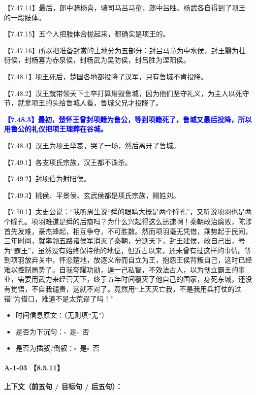 \documentclass[fontset=none,11pt,a4paper]{ctexart}
\newcommand{\answerline}[1]{\underline{\hspace{#1}}}
\newcommand{\choicebox}[1]{$\square$~#1}
\begin{document}
\noindent 【7.47.14】最后，郎中骑杨喜，骑司马吕马童，郎中吕胜、杨武各自得到了项王的一段肢体。\par
\noindent 【7.47.15】五个人把肢体合拢起来，都确实是项王的。\par
\noindent 【7.47.16】所以把准备封赏的土地分为五部分：封吕马童为中水侯，封王翳为杜衍侯，封杨喜为赤泉侯，封杨武为吴防侯，封吕胜为涅阳侯。\par
\noindent 【7.48.1】项王死后，楚国各地都投降了汉军，只有鲁城不肯投降。\par
\noindent 【7.48.2】汉王就带领天下士卒打算屠毁鲁城，因为他们坚守礼义，为主人以死守节，就拿项王的头给鲁城人看，鲁城父兄才投降了。\par
\noindent \textcolor{blue}{\textbf{【7.48.3】最初，楚怀王曾封项籍为鲁公，等到项籍死了，鲁城又最后投降，所以用鲁公的礼仪把项王理葬在谷城。}}\par
\noindent 【7.48.4】汉王为项王举哀，哭了一场，然后离开了鲁城。\par
\noindent 【7.49.1】各支项氏宗族，汉王都不诛杀。\par
\noindent 【7.49.2】封项伯为射阳侯。\par
\noindent 【7.49.3】桃侯、平景侯、玄武侯都是项氏宗族，赐姓刘。\par
\noindent 【7.50.1】太史公说：“我听周生说“舜的眼睛大概是两个瞳孔”，又听说项羽也是两个瞳孔。项羽难道是舜的后裔吗？为什么兴起得这么迅速啊！秦朝政治腐败，陈涉首先发难，豪杰蜂起，相互争夺，不可胜数。然而项羽毫无凭借，乘势起于民间，三年时间，就率领五路诸侯军消灭了秦朝，分割天下，封王建侯，政自己出，号为“霸王”，虽然没有始终保持他的地位，但近古以来，还未曾有过这样的事情。等到项羽放弃关中，怀恋楚地，放逐义帝而自立为王，抱怨王侯背叛自己，这时已经难以控制局势了。自我夸耀功勋，逞一己私智，不效法古人，以为创立霸王的事业，需要用武力来经营天下，终于五年时间覆灭了他自己的国家，身死东城，还没有觉悟，不自我谴责，这就不对了。竟然用“上天灭亡我，不是我用兵打仗的过错”为借口，难道不是太荒谬了吗！”\par

\begin{itemize}
  \item 时间信息原文：\answerline{7.5cm}（无则填“无”）
  \item 是否为下沉句：\choicebox{是}\quad \choicebox{否}
  \item 是否为插叙/倒叙：\choicebox{是}\quad \choicebox{否}
\end{itemize}

\paragraph{A-1-03 \quad 【8.5.11】}
\textbf{上下文（前五句 / 目标句 / 后五句）：}
\end{document}
